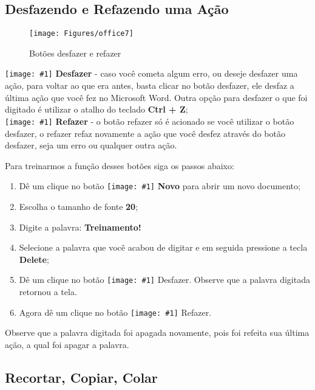 \documentclass[hidelinks,12pt]{article}
\newcommand{\icon}[1]{\texttt{[image: \#1]}}
\begin{document}
	\subsection{Desfazendo e Refazendo uma Ação}


	\begin{figure}[!h]
		\centering
		\texttt{[image: Figures/office7]}
		\label{fig:office7}
		\caption{Botões desfazer e refazer}
	\end{figure}

	\icon{Figures/desfazer} \textbf{Desfazer} - caso você cometa algum erro, ou deseje desfazer uma ação, para voltar ao que era antes, basta clicar no botão desfazer, ele desfaz a última ação que você fez no Microsoft Word. Outra opção para desfazer o que foi digitado é utilizar o atalho do teclado \textbf{Ctrl + Z};\\

	\icon{Figures/refazer} \textbf{Refazer} - o botão refazer só é acionado se você utilizar o botão desfazer, o refazer refaz novamente a ação que você desfez através do botão desfazer, seja um erro ou qualquer outra ação.

	Para treinarmos a função desses botões siga os passos abaixo:

	\begin{enumerate}
		\item Dê um clique no botão \icon{Figures/novo} \textbf{Novo} para abrir um novo documento;

		\item Escolha o tamanho de fonte \textbf{20};

		\item  Digite a palavra: \textbf{Treinamento!}


		\item Selecione a palavra que você acabou de digitar e em seguida pressione a tecla \textbf{Delete};

		\item Dê um clique no botão \icon{Figures/desfazer} Desfazer. Observe que a palavra digitada retornou  a tela.

		\item Agora dê um clique no botão \icon{Figures/refazer} Refazer.
	\end{enumerate}

	Observe que a palavra digitada foi apagada novamente, pois foi refeita sua última ação, a qual foi apagar a palavra.


	\subsection{Recortar, Copiar, Colar}
\end{document}
